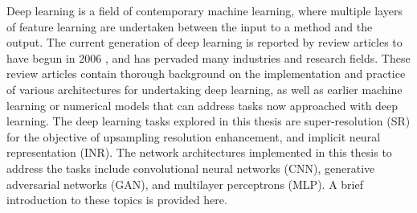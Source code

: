 Deep learning is a field of contemporary machine learning, where multiple layers of feature learning are undertaken between the input to a method and the output.
The current generation of deep learning is reported by review articles to have begun in 2006 \parencite{dengDeepLearningMethods2014,goodfellowDeepLearning2016a}, and has pervaded many industries and research fields.
These review articles contain thorough background on the implementation and practice of various architectures for undertaking deep learning, as well as earlier machine learning or numerical models that can address tasks now approached with deep learning.
The deep learning tasks explored in this thesis are super-resolution (SR) for the objective of upsampling resolution enhancement, and implicit neural representation (INR).
The network architectures implemented in this thesis to address the tasks include convolutional neural networks (CNN), generative adversarial networks (GAN), and multilayer perceptrons (MLP).
A brief introduction to these topics is provided here.

